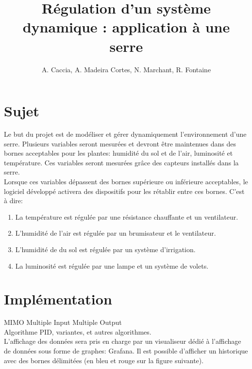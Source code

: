 \documentclass[a4paper,10pt]{article}
\title{Régulation d'un système dynamique : application à une serre}
\author{A. Caccia, A. Madeira Cortes, N. Marchant, R. Fontaine}
\date{ }
\begin{document}
\maketitle

\vspace{1cm}

\section{Sujet}

Le but du projet est de modéliser et gérer dynamiquement l'environnement d'une serre. Plusieurs variables seront mesurées et devront être maintenues dans des bornes acceptables pour les plantes: humidité du sol et de l'air, luminosité et température. Ces variables seront mesurées grâce des capteurs installés dans la serre. \\

Lorsque ces variables dépassent des bornes supérieure ou inférieure acceptables, le logiciel développé activera des dispositifs pour les rétablir entre ces bornes. C'est à dire: \\

\begin{enumerate}
	\item La température est régulée par une résistance chauffante et un ventilateur.
	\item L'humidité de l'air est régulée par un brumisateur et le ventilateur.
	\item L'humidité de du sol est régulée par un système d'irrigation.
	\item La luminosité est régulée par une lampe et un système de volets.\\
\end{enumerate}

\section{Implémentation}

MIMO Multiple Input Multiple Output \\

Algorithme PID, variantes, et autres algorithmes.\\

L'affichage des données sera pris en charge par un visualiseur dédié à l'affichage de données sous forme de graphes: Grafana. Il est possible d'afficher un historique avec des bornes délimitées (en bleu et rouge sur la figure suivante). \\
\end{document}
